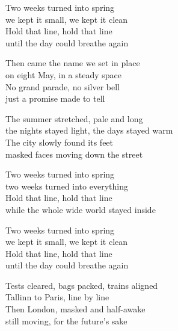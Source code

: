 \begin{lyrics}
Two weeks turned into spring\\
we kept it small, we kept it clean\\
Hold that line, hold that line\\
until the day could breathe again

Then came the name we set in place\\
on eight May, in a steady space\\
No grand parade, no silver bell\\
just a promise made to tell

The summer stretched, pale and long\\
the nights stayed light, the days stayed warm\\
The city slowly found its feet\\
masked faces moving down the street

Two weeks turned into spring\\
two weeks turned into everything\\
Hold that line, hold that line\\
while the whole wide world stayed inside

Two weeks turned into spring\\
we kept it small, we kept it clean\\
Hold that line, hold that line\\
until the day could breathe again

Tests cleared, bags packed, trains aligned\\
Tallinn to Paris, line by line\\
Then London, masked and half-awake\\
still moving, for the future’s sake
\end{lyrics}

